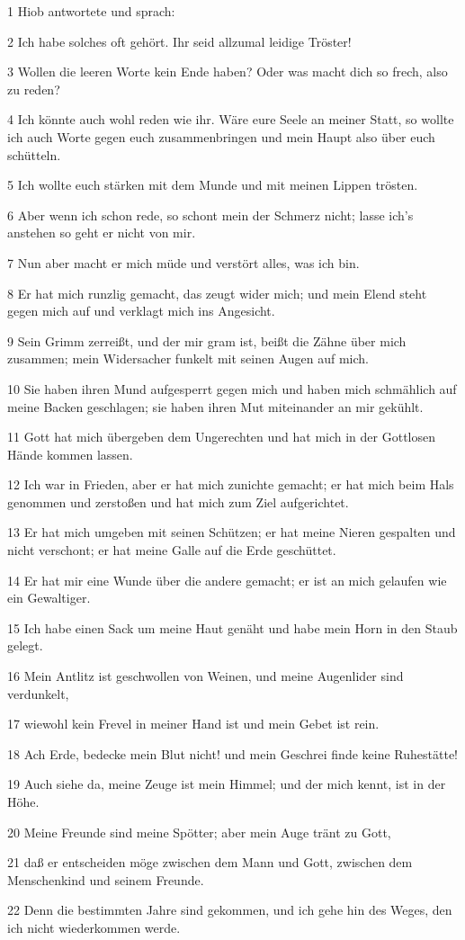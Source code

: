 \par 1 Hiob antwortete und sprach:
\par 2 Ich habe solches oft gehört. Ihr seid allzumal leidige Tröster!
\par 3 Wollen die leeren Worte kein Ende haben? Oder was macht dich so frech, also zu reden?
\par 4 Ich könnte auch wohl reden wie ihr. Wäre eure Seele an meiner Statt, so wollte ich auch Worte gegen euch zusammenbringen und mein Haupt also über euch schütteln.
\par 5 Ich wollte euch stärken mit dem Munde und mit meinen Lippen trösten.
\par 6 Aber wenn ich schon rede, so schont mein der Schmerz nicht; lasse ich's anstehen so geht er nicht von mir.
\par 7 Nun aber macht er mich müde und verstört alles, was ich bin.
\par 8 Er hat mich runzlig gemacht, das zeugt wider mich; und mein Elend steht gegen mich auf und verklagt mich ins Angesicht.
\par 9 Sein Grimm zerreißt, und der mir gram ist, beißt die Zähne über mich zusammen; mein Widersacher funkelt mit seinen Augen auf mich.
\par 10 Sie haben ihren Mund aufgesperrt gegen mich und haben mich schmählich auf meine Backen geschlagen; sie haben ihren Mut miteinander an mir gekühlt.
\par 11 Gott hat mich übergeben dem Ungerechten und hat mich in der Gottlosen Hände kommen lassen.
\par 12 Ich war in Frieden, aber er hat mich zunichte gemacht; er hat mich beim Hals genommen und zerstoßen und hat mich zum Ziel aufgerichtet.
\par 13 Er hat mich umgeben mit seinen Schützen; er hat meine Nieren gespalten und nicht verschont; er hat meine Galle auf die Erde geschüttet.
\par 14 Er hat mir eine Wunde über die andere gemacht; er ist an mich gelaufen wie ein Gewaltiger.
\par 15 Ich habe einen Sack um meine Haut genäht und habe mein Horn in den Staub gelegt.
\par 16 Mein Antlitz ist geschwollen von Weinen, und meine Augenlider sind verdunkelt,
\par 17 wiewohl kein Frevel in meiner Hand ist und mein Gebet ist rein.
\par 18 Ach Erde, bedecke mein Blut nicht! und mein Geschrei finde keine Ruhestätte!
\par 19 Auch siehe da, meine Zeuge ist mein Himmel; und der mich kennt, ist in der Höhe.
\par 20 Meine Freunde sind meine Spötter; aber mein Auge tränt zu Gott,
\par 21 daß er entscheiden möge zwischen dem Mann und Gott, zwischen dem Menschenkind und seinem Freunde.
\par 22 Denn die bestimmten Jahre sind gekommen, und ich gehe hin des Weges, den ich nicht wiederkommen werde.

